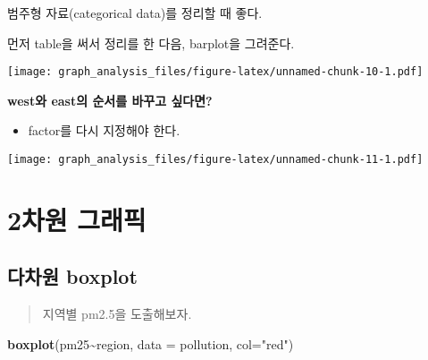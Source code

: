 \documentclass[
]{article}
\newenvironment{Shaded}{\begin{snugshade}}{\end{snugshade}}
\newcommand{\AttributeTok}[1]{\textcolor[rgb]{0.13,0.29,0.53}{#1}}
\newcommand{\FunctionTok}[1]{\textcolor[rgb]{0.13,0.29,0.53}{\textbf{#1}}}
\newcommand{\NormalTok}[1]{#1}
\newcommand{\OtherTok}[1]{\textcolor[rgb]{0.56,0.35,0.01}{#1}}
\newcommand{\SpecialCharTok}[1]{\textcolor[rgb]{0.81,0.36,0.00}{\textbf{#1}}}
\newcommand{\StringTok}[1]{\textcolor[rgb]{0.31,0.60,0.02}{#1}}
\providecommand{\tightlist}{%
  \setlength{\itemsep}{0pt}\setlength{\parskip}{0pt}}
\begin{document}
범주형 자료(categorical data)를 정리할 때 좋다.

먼저 table을 써서 정리를 한 다음, barplot을 그려준다.

\begin{Shaded}
\end{Shaded}

\texttt{[image: graph\_analysis\_files/figure-latex/unnamed-chunk-10-1.pdf]}

\textbf{west와 east의 순서를 바꾸고 싶다면?}

\begin{itemize}
\tightlist
\item
  factor를 다시 지정해야 한다.
\end{itemize}

\begin{Shaded}
\end{Shaded}

\texttt{[image: graph\_analysis\_files/figure-latex/unnamed-chunk-11-1.pdf]}

\section{2차원 그래픽}\label{uxcc28uxc6d0-uxadf8uxb798uxd53d}

\subsection{다차원 boxplot}\label{uxb2e4uxcc28uxc6d0-boxplot}

\begin{quote}
지역별 pm2.5을 도출해보자.
\end{quote}

\begin{Shaded}
\begin{Highlighting}[]
\FunctionTok{boxplot}\NormalTok{(pm25}\SpecialCharTok{\textasciitilde{}}\NormalTok{region, }\AttributeTok{data =}\NormalTok{ pollution, }\AttributeTok{col=}\StringTok{"red"}\NormalTok{)}
\end{Highlighting}
\end{Shaded}
\end{document}
